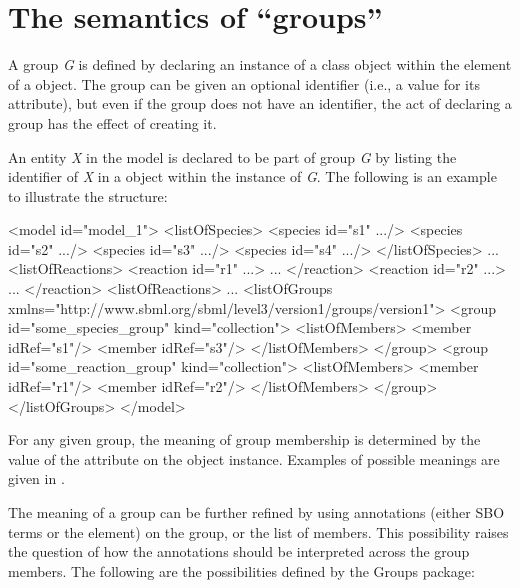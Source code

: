 \section{The semantics of ``groups''}
\label{semantics}

A group \emph{G} is defined by declaring an instance of a \Group class object within the \ListOfGroups element of a \Model object. The group can be given an optional identifier (i.e., a value for its  attribute), but even if the group does not have an identifier, the act of declaring a group has the effect of creating it.

An entity \emph{X} in the model is declared to be part of group \emph{G} by listing the identifier of \emph{X} in a \Member object within the \ListOfGroups instance of \emph{G}. The following is an example to illustrate the structure:

\begin{example}
<model id="model_1"> 
  <listOfSpecies> 
    <species id="s1" .../> 
    <species id="s2" .../> 
    <species id="s3" .../> 
    <species id="s4" .../> 
  </listOfSpecies> 
  ... 
  <listOfReactions> 
    <reaction id="r1" ...> ... </reaction> 
    <reaction id="r2" ...> ... </reaction> 
  <listOfReactions> 
  ... 
  <listOfGroups xmlns="http://www.sbml.org/sbml/level3/version1/groups/version1"> 
    <group id="some_species_group" kind="collection"> 
      <listOfMembers> 
        <member idRef="s1"/> 
        <member idRef="s3"/> 
      </listOfMembers> 
    </group> 
    <group id="some_reaction_group" kind="collection"> 
      <listOfMembers> 
        <member idRef="r1"/> 
        <member idRef="r2"/> 
      </listOfMembers> 
    </group> 
  </listOfGroups> 
</model>
\end{example}

For any given group, the meaning of group membership is determined by the value of the attribute  on the \Group object instance.  Examples of possible meanings are given in .

The meaning of a group can be further refined by using annotations (either SBO terms or the \Annotation element) on the group, or the list of members. This possibility raises the question of how the annotations should be interpreted across the group members.  The following are the possibilities defined by the Groups package:

